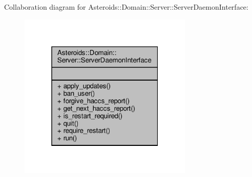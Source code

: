 Collaboration diagram for Asteroids\+:\+:Domain\+:\+:Server\+:\+:Server\+Daemon\+Interface\+:\nopagebreak
\begin{figure}[H]
\begin{center}
\leavevmode
\includegraphics[width=235pt]{classAsteroids_1_1Domain_1_1Server_1_1ServerDaemonInterface__coll__graph}
\end{center}
\end{figure}
